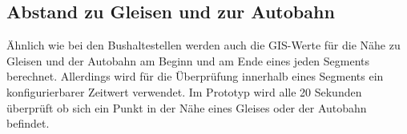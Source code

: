 \subsection{Abstand zu Gleisen und zur Autobahn}
\label{abstand-gleis-autobahn}
Ähnlich wie bei den Bushaltestellen werden auch die GIS-Werte für die Nähe zu Gleisen und der Autobahn am Beginn und am Ende eines jeden Segments berechnet. Allerdings wird für die Überprüfung innerhalb eines Segments ein konfigurierbarer Zeitwert verwendet. Im Prototyp wird alle 20 Sekunden überprüft ob sich ein Punkt in der Nähe eines Gleises oder der Autobahn befindet.
